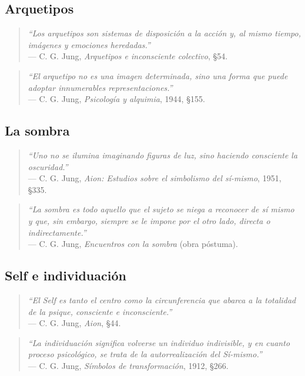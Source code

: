 \subsection*{Arquetipos}

\begin{quote}
	\emph{“Los arquetipos son sistemas de disposición a la acción y, al mismo tiempo, imágenes y emociones heredadas.”} \\
	— C. G. Jung, \emph{Arquetipos e inconsciente colectivo}, §54.
\end{quote}

\begin{quote}
	\emph{“El arquetipo no es una imagen determinada, sino una forma que puede adoptar innumerables representaciones.”} \\
	— C. G. Jung, \emph{Psicología y alquimia}, 1944, §155.
\end{quote}

\subsection*{La sombra}

\begin{quote}
	\emph{“Uno no se ilumina imaginando figuras de luz, sino haciendo consciente la oscuridad.”} \\
	— C. G. Jung, \emph{Aion: Estudios sobre el simbolismo del sí-mismo}, 1951, §335.
\end{quote}

\begin{quote}
	\emph{“La sombra es todo aquello que el sujeto se niega a reconocer de sí mismo y que, sin embargo, siempre se le impone por el otro lado, directa o indirectamente.”} \\
	— C. G. Jung, \emph{Encuentros con la sombra} (obra póstuma).
\end{quote}

\subsection*{Self e individuación}

\begin{quote}
	\emph{“El Self es tanto el centro como la circunferencia que abarca a la totalidad de la psique, consciente e inconsciente.”} \\
	— C. G. Jung, \emph{Aion}, §44.
\end{quote}

\begin{quote}
	\emph{“La individuación significa volverse un individuo indivisible, y en cuanto proceso psicológico, se trata de la autorrealización del Sí-mismo.”} \\
	— C. G. Jung, \emph{Símbolos de transformación}, 1912, §266.
\end{quote}

